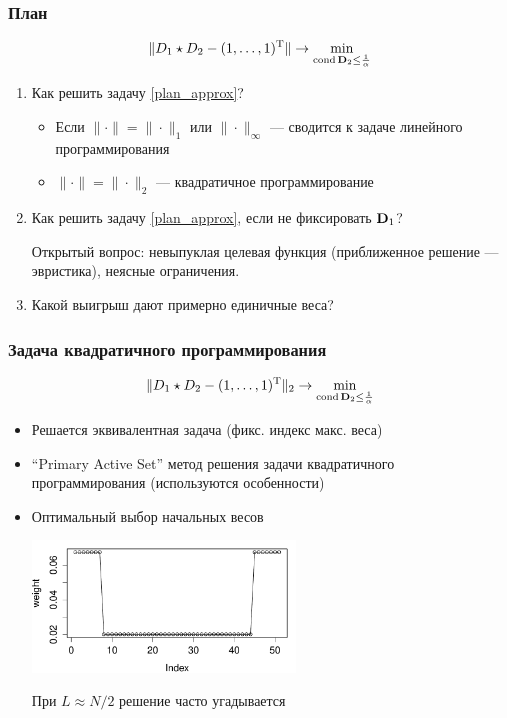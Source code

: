 \documentclass[unicode, notheorems]{beamer}
\DeclareMathOperator{\cond}{cond}
\begin{document}
\begin{frame}
	\frametitle{План}
	\begin{equation}\label{plan_approx}
	\|D_1 \star D_2 - (1, \ldots, 1)^\rmT\| \to \min_{\cond \bfD_2 \le \frac{1}{\alpha}}
	\end{equation}
	
	\begin{enumerate}
		\item Как решить задачу \eqref{plan_approx}?
		\begin{itemize}
			\item
		Если $\|\cdot\| = \|\cdot\|_1$ или $\|\cdot\|_\infty$ --- сводится к задаче линейного программирования
		\item \pause
		$\|\cdot\| = \|\cdot\|_2$ --- квадратичное программирование	
		\end{itemize}

		
		\pause
		\item Как решить задачу \eqref{plan_approx}, если не фиксировать $\mathbf{D}_1$?
		
		\pause
		Открытый вопрос: невыпуклая целевая функция (приближенное решение --- эвристика), неясные ограничения.
		\item Какой выигрыш дают примерно единичные веса?
	\end{enumerate}
	
\end{frame}

\begin{frame}
	\frametitle{Задача квадратичного программирования}
	\vspace{-0.4cm}
	\begin{equation*}
	\|D_1 \star D_2 - (1, \ldots, 1)^\rmT\|_2 \to \min_{\cond \bfD_2 \le \frac{1}{\alpha}}
	\end{equation*}
	\begin{itemize}
		\item Решается эквивалентная задача (фикс. индекс макс. веса)
		\item ``Primary Active Set'' метод решения задачи квадратичного программирования (используются особенности)
		\item Оптимальный выбор начальных весов

	\vspace{-0.3cm}
	    \begin{center}
		    \includegraphics*[width = 7cm]{qpsp.pdf}
    	\end{center}		
		При $L \approx N/2$ решение часто угадывается
	\end{itemize}
\end{frame}
\end{document}
